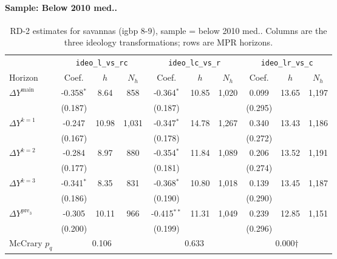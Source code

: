 \documentclass[11pt]{article}
\begin{document}
\paragraph{Sample: Below 2010 med..}
\begin{table}[H]
\centering
\scriptsize
\caption{RD-2 estimates for savannas (igbp 8-9), sample = below 2010 med..
Columns are the three ideology transformations; rows are MPR horizons.}
\label{tab:rd2_savannas_below}
\begin{tabular}{l ccc ccc ccc}
\toprule
 & \multicolumn{3}{c}{\texttt{ideo\_l\_vs\_rc}}
 & \multicolumn{3}{c}{\texttt{ideo\_lc\_vs\_r}}
 & \multicolumn{3}{c}{\texttt{ideo\_lr\_vs\_c}} \\
\cmidrule(lr){2-4} \cmidrule(lr){5-7} \cmidrule(lr){8-10}
Horizon & Coef. & $h$ & $N_h$ & Coef. & $h$ & $N_h$ & Coef. & $h$ & $N_h$ \\
\midrule
$\Delta Y^{\text{main}}$ & -0.358$^{*}$ & 8.64 & 858 & -0.364$^{*}$ & 10.85 & 1,020 & 0.099 & 13.65 & 1,197 \\
 & (0.187) &  &  & (0.187) &  &  & (0.295) &  &  \\
\addlinespace[1pt]
$\Delta Y^{k=1}$ & -0.247 & 10.98 & 1,031 & -0.347$^{*}$ & 14.78 & 1,267 & 0.340 & 13.43 & 1,186 \\
 & (0.167) &  &  & (0.178) &  &  & (0.272) &  &  \\
\addlinespace[1pt]
$\Delta Y^{k=2}$ & -0.284 & 8.97 & 880 & -0.354$^{*}$ & 11.84 & 1,089 & 0.206 & 13.52 & 1,191 \\
 & (0.177) &  &  & (0.181) &  &  & (0.274) &  &  \\
\addlinespace[1pt]
$\Delta Y^{k=3}$ & -0.341$^{*}$ & 8.35 & 831 & -0.368$^{*}$ & 10.80 & 1,018 & 0.139 & 13.45 & 1,187 \\
 & (0.186) &  &  & (0.190) &  &  & (0.290) &  &  \\
\addlinespace[1pt]
$\Delta Y^{\text{pre}_3}$ & -0.305 & 10.11 & 966 & -0.415$^{**}$ & 11.31 & 1,049 & 0.239 & 12.85 & 1,151 \\
 & (0.200) &  &  & (0.199) &  &  & (0.296) &  &  \\
\addlinespace[1pt]
\midrule
McCrary $p_q$ & \multicolumn{3}{c}{0.106} & \multicolumn{3}{c}{0.633} & \multicolumn{3}{c}{0.000$\dagger$} \\
\bottomrule
\end{tabular}
\end{table}
\end{document}

